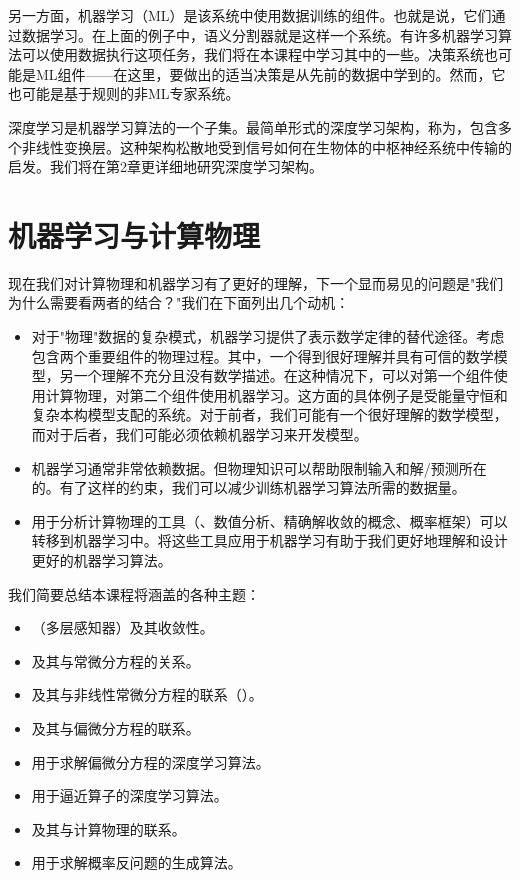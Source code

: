 另一方面，机器学习（ML）是该系统中使用数据训练的组件。也就是说，它们通过数据学习。在上面的例子中，语义分割器就是这样一个系统。有许多机器学习算法可以使用数据执行这项任务，我们将在本课程中学习其中的一些。决策系统也可能是ML组件——在这里，要做出的适当决策是从先前的数据中学到的。然而，它也可能是基于规则的非ML专家系统。

深度学习是机器学习算法的一个子集。最简单形式的深度学习架构，称为，包含多个非线性变换层。这种架构松散地受到信号如何在生物体的中枢神经系统中传输的启发。我们将在第2章更详细地研究深度学习架构。

\section{机器学习与计算物理}
\label{sec:ml_cp_combination}

现在我们对计算物理和机器学习有了更好的理解，下一个显而易见的问题是"我们为什么需要看两者的结合？"我们在下面列出几个动机：

\begin{itemize}
\item 对于"物理"数据的复杂模式，机器学习提供了表示数学定律的替代途径。考虑包含两个重要组件的物理过程。其中，一个得到很好理解并具有可信的数学模型，另一个理解不充分且没有数学描述。在这种情况下，可以对第一个组件使用计算物理，对第二个组件使用机器学习。这方面的具体例子是受能量守恒和复杂本构模型支配的系统。对于前者，我们可能有一个很好理解的数学模型，而对于后者，我们可能必须依赖机器学习来开发模型。

\item 机器学习通常非常依赖数据。但物理知识可以帮助限制输入和解/预测所在的。有了这样的约束，我们可以减少训练机器学习算法所需的数据量。

\item 用于分析计算物理的工具（、数值分析、精确解收敛的概念、概率框架）可以转移到机器学习中。将这些工具应用于机器学习有助于我们更好地理解和设计更好的机器学习算法。
\end{itemize}

我们简要总结本课程将涵盖的各种主题：

\begin{itemize}
\item {}（多层感知器）及其收敛性。
\item {}及其与常微分方程的关系。
\item {}及其与非线性常微分方程的联系（）。
\item {}及其与偏微分方程的联系。
\item 用于求解偏微分方程的深度学习算法。
\item 用于逼近算子的深度学习算法。
\item {}及其与计算物理的联系。
\item 用于求解概率反问题的生成算法。
\end{itemize}

